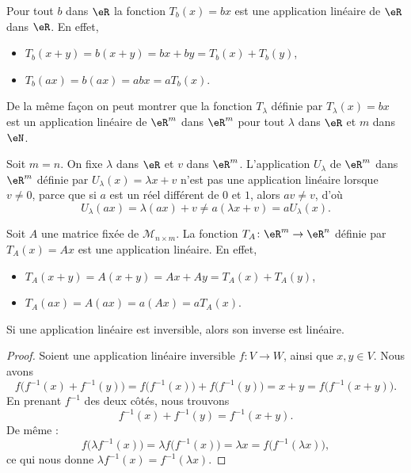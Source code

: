 \begin{example}
Pour tout $b$ dans $\eR$ la fonction $T_b(x)= bx$ est une application linéaire de $\eR$ dans $\eR$. En effet,
\begin{itemize}
\item  $T_b(x+y)= b(x+y)= bx + by = T_b(x)+T_b(y)$,
\item $T_b(ax)=b(ax)= abx = a T_b(x)$.
\end{itemize}
De la même façon on peut montrer que la fonction $T_{\lambda}$ définie par $T_{\lambda}(x)=bx$ est un application linéaire de $\eR^m$ dans $\eR^m$ pour tout $\lambda$ dans $\eR$ et $m$ dans $\eN$.
\end{example}

\begin{example}\label{ex_affine}
	Soit $m=n$. On fixe $\lambda$ dans $\eR$ et $v$ dans $\eR^m$. L'application $U_{\lambda}$ de $\eR^m$ dans $\eR^m$ définie par $U_{\lambda}(x)=\lambda x+v$ n'est pas une application linéaire lorsque \( v \neq 0 \), parce que si \( a \) est un réel différent de \(0 \) et \( 1 \), alors \( av \neq v \), d'où
\[
U_{\lambda}(ax)=\lambda(ax)+v\neq a(\lambda x+v) =a U_{\lambda}(x).
\]
\end{example}

\begin{example}\label{exampleT_A}
	Soit $A$ une matrice fixée de $\mathcal{M}_{n\times m}$. La fonction $T_A\colon \eR^m\to \eR^n$ définie par $T_A(x)=Ax$ est une application linéaire. En effet,
    \begin{itemize}
        \item  $T_A(x+y)= A(x+y)= Ax + Ay = T_A(x)+T_A(y)$,
        \item $T_A(ax)=A(ax)= a(Ax) = a T_A(x)$.
    \end{itemize}
\end{example}

\begin{lemma}       \label{LEMooLGEHooVEEoiU}
    Si une application linéaire est inversible, alors son inverse est linéaire.
\end{lemma}

\begin{proof}
    Soient une application linéaire inversible \( f\colon V\to W\), ainsi que \( x,y\in V\). Nous avons
    \begin{equation}
        f\big( f^{-1}(x)+f^{-1}(y) \big)=f\big( f^{-1}(x) \big)+f\big( f^{-1}(y) \big)=x+y=f\big( f^{-1}(x+y) \big).
    \end{equation}
    En prenant \( f^{-1}\) des deux côtés, nous trouvons
    \begin{equation}
        f^{-1}(x)+f^{-1}(y)=f^{-1}(x+y).
    \end{equation}
    De même :
    \begin{equation}
        f\big( \lambda f^{-1}(x) \big)=\lambda f\big( f^{-1}(x) \big)=\lambda x=f\big( f^{-1}(\lambda x) \big),
    \end{equation}
    ce qui nous donne \( \lambda f^{-1}(x)=f^{-1}(\lambda x)\).
\end{proof}

